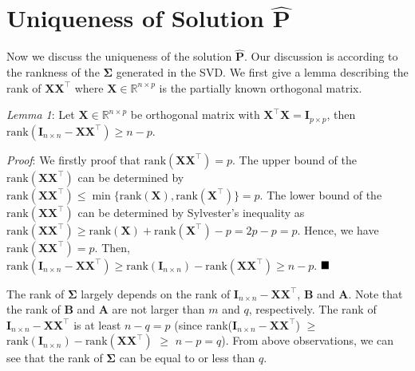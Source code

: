 \documentclass[titlepage,11pt,twoside]{article}
\begin{document}
\section{Uniqueness of Solution $\mathbf{\hat{P}}$}

Now we discuss the uniqueness of the solution $\mathbf{\hat{P}}$. Our discussion is according to the rankness of the $\mathbf{\Sigma}$ generated in the SVD. We first give a lemma describing the rank of $\mathbf{X}\mathbf{X}^{\top}$ where $\mathbf{X}\in\mathbb{R}^{n\times p}$ is the partially known orthogonal matrix. 

\emph{Lemma 1}: Let $\mathbf{X}\in\mathbb{R}^{n\times p}$ be orthogonal matrix with $\mathbf{X}^{\top}\mathbf{X}=\mathbf{I}_{p\times p}$, then $\text{rank}(\mathbf{I}_{n\times n}-\mathbf{X}\mathbf{X}^{\top})\ge n-p$.

\emph{Proof}: We firstly proof that $\text{rank}(\mathbf{X}\mathbf{X}^{\top})=p$. The upper bound of the $\text{rank}(\mathbf{X}\mathbf{X}^{\top})$ can be determined by $\text{rank}(\mathbf{X}\mathbf{X}^{\top})\le\min\{\text{rank}(\mathbf{X}),\text{rank}(\mathbf{X}^{\top})\}=p$. The lower bound of the $\text{rank}(\mathbf{X}\mathbf{X}^{\top})$ can be determined by Sylvester's inequality as $\text{rank}(\mathbf{X}\mathbf{X}^{\top})\ge\text{rank}(\mathbf{X})+\text{rank}(\mathbf{X}^{\top})-p=2p-p=p$. Hence, we have $\text{rank}(\mathbf{X}\mathbf{X}^{\top})=p$. Then, $\text{rank}(\mathbf{I}_{n\times n}-\mathbf{X}\mathbf{X}^{\top})\ge\text{rank}(\mathbf{I}_{n\times n})-\text{rank}(\mathbf{X}\mathbf{X}^{\top})\ge n-p$. 
$\hfill\blacksquare$ 

The rank of $\mathbf{\Sigma}$ largely depends on the rank of $\mathbf{I}_{n\times n}-\mathbf{X}\mathbf{X}^{\top}$, $\mathbf{B}$ and $\mathbf{A}$. Note that the rank of $\mathbf{B}$ and $\mathbf{A}$ are not larger than $m$ and $q$, respectively. The rank of $\mathbf{I}_{n\times n}-\mathbf{X}\mathbf{X}^{\top}$ is at least $n-q=p$ (since rank($\mathbf{I}_{n\times n}-\mathbf{X}\mathbf{X}^{\top}$) $\ge$ $\text{rank}(\mathbf{I}_{n\times n}) - \text{rank}(\mathbf{X}\mathbf{X}^{\top})$ $\ge$ $n-p=q$). From above observations, we can see that the rank of $\mathbf{\Sigma}$ can be equal to or less than $q$. 
\end{document}
